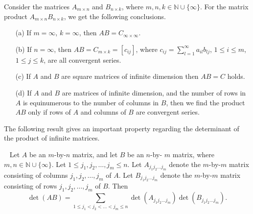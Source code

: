 \begin{definition}
  Consider the matrices $A_{m\times n}$ and $B_{n \times k}$, where $m,n,k\in \mathbb{N}\cup \{\infty\}$. For the matrix product $A_{m\times n}B_{n \times k}$, we get the following conclusions.
\begin{enumerate}
 \item[(a)] If $m = \infty$, $k = \infty$, then $AB = C_{\infty \times \infty}$.
 \item[(b)] If $n = \infty$, then $AB = C_{m \times k} = [c_{ij}]$, where $c_{ij} = \sum_{l=1}^{\infty} a_{il}b_{lj}$, $1 \leq i \leq m$, $1 \leq j \leq k$, are all convergent series.
 \item[(c)] If $A$ and $B$ are square matrices of infinite dimension then $AB = C$ holds.
 \item[(d)] If $A$ and $B$ are matrices of infinite dimension, and the number of rows in $A$ is equinumerous to the number of columns in $B$, then we find the product $AB$ only if rows of $A$ and columns of $B$ are convergent series.
\end{enumerate}
\end{definition}





The following result gives an important property regarding the determinant of the product of infinite matrices.  

\begin{proposition}~\cite{amgopaper}
 Let $A$ be an $m$-by-$n$ matrix, and let $B$ be an $n$-by- $m$ matrix, where $m, n \in \mathbb{N} \cup \{\infty\}$. Let $1 \leq j_1, j_2, \ldots, j_m \leq n$. Let $A_{j_1j_2\ldots j_m}$ denote the $m$-by-$m$ matrix consisting of columns $j_1, j_2, \ldots, j_m$ of $A$. Let $B_{j_1j_2\ldots j_m}$ denote the $m$-by-$m$ matrix consisting of rows $j_1, j_2, \ldots, j_m$ of $B$. Then
\[\det(AB) = \sum_{1 \leq j_1 < j_2 < \ldots < j_m \leq n} \det(A_{j_1j_2\ldots j_m}) \det(B_{j_1j_2\ldots j_m}).\]
\end{proposition}



